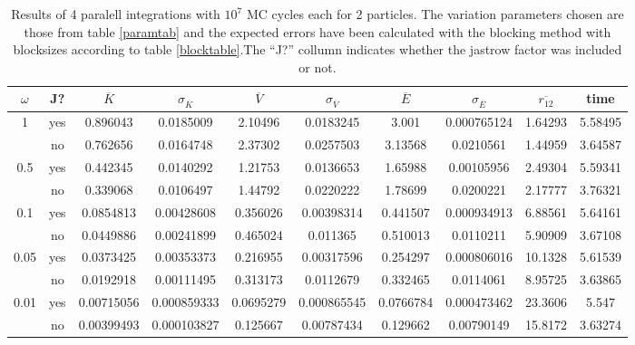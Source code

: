 \documentclass[a4paper,English,10pt]{article}
\renewcommand{\bar}{\overline}
\begin{document}
\begin{table}
  \centering
  \caption[Results 2 particles]{Results of 4 paralell integrations with $10^7$ MC cycles each for 2 particles.
    The variation parameters chosen are those from table \ref{paramtab} and the expected errors have been calculated with the blocking method with blocksizes
    according to table \ref{blocktable}.The ``J?'' collumn indicates whether the jastrow factor was included or not.}
  \label{Etab2}
  \begin{tabular}{*{10}c}
    \toprule
    $\omega$ &J?& $\bar{K}$ & $\sigma_{\bar{K}}$& $\bar{V}$& $\sigma_{\bar{V}}$& $\bar{E}$  & $\sigma_{\bar{E}}$ & $\bar{r_{12}}$ &time\\
    \midrule
    1 &yes &0.896043	&0.0185009	&2.10496	&0.0183245	&3.001	&0.000765124	&1.64293&5.58495\\
    &no & 0.762656	& 0.0164748	& 2.37302	& 0.0257503	& 3.13568	& 0.0210561	& 1.44959 & 3.64587\\
    0.5 &yes& 0.442345	&0.0140292	&1.21753	&0.0136653	&1.65988	&0.00105956	&2.49304 &5.59341 \\
    &no & 0.339068	& 0.0106497	& 1.44792	& 0.0220222    &	1.78699 &	0.0200221 &	2.17777 & 3.76321\\
    0.1&yes &0.0854813	&0.00428608	&0.356026	&0.00398314	&0.441507	&0.000934913	&6.88561&5.64161 \\
    & no & 0.0449886& 0.00241899 &	0.465024 &	0.011365 &	0.510013 &	0.0110211 &	5.90909&3.67108\\
    0.05&yes &0.0373425	&0.00353373	&0.216955	&0.00317596	&0.254297	&0.000806016	&10.1328  &5.61539 \\
    &no&0.0192918	&0.00111495&	0.313173&	0.0112679&	0.332465	&0.0114061&	8.95725&3.63865\\
    0.01&yes &0.00715056	&0.000859333	&0.0695279	&0.000865545	&0.0766784	&0.000473462	&23.3606&5.547\\
    &no&0.00399493	&0.000103827	&0.125667	&0.00787434	&0.129662	&0.00790149	&15.8172&3.63274\\
    \bottomrule
  \end{tabular}
\end{table}
\end{document}
